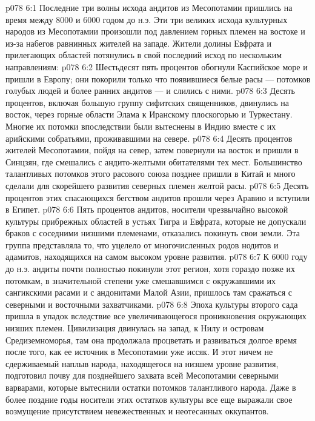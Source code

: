 \vs p078 6:1 Последние три волны исхода андитов из Месопотамии пришлись на время между 8000 и 6000 годом до н.э. Эти три великих исхода культурных народов из Месопотамии произошли под давлением горных племен на востоке и из\hyp{}за набегов равнинных жителей на западе. Жители долины Евфрата и прилегающих областей потянулись в свой последний исход по нескольким направлениям:
\vs p078 6:2 Шестьдесят пять процентов обогнули Каспийское море и пришли в Европу; они покорили только что появившиеся белые расы --- потомков голубых людей и более ранних андитов --- и слились с ними.
\vs p078 6:3 Десять процентов, включая большую группу сифитских священников, двинулись на восток, через горные области Элама к Иранскому плоскогорью и Туркестану. Многие их потомки впоследствии были вытеснены в Индию вместе с их арийскими собратьями, проживавшими на севере.
\vs p078 6:4 Десять процентов жителей Месопотамии, пойдя на север, затем повернули на восток и пришли в Синцзян, где смешались с андито\hyp{}желтыми обитателями тех мест. Большинство талантливых потомков этого расового союза позднее пришли в Китай и много сделали для скорейшего развития северных племен желтой расы.
\vs p078 6:5 Десять процентов этих спасающихся бегством андитов прошли через Аравию и вступили в Египет.
\vs p078 6:6 \pc Пять процентов андитов, носители чрезвычайно высокой культуры прибрежных областей в устьях Тигра и Евфрата, которые не допускали браков с соседними низшими племенами, отказались покинуть свои земли. Эта группа представляла то, что уцелело от многочисленных родов нодитов и адамитов, находящихся на самом высоком уровне развития.
\vs p078 6:7 \pc К 6000 году до н.э. андиты почти полностью покинули этот регион, хотя гораздо позже их потомкам, в значительной степени уже смешавшимся с окружавшими их сангикскими расами и с андонитами Малой Азии, пришлось там сражаться с северными и восточными захватчиками.
\vs p078 6:8 Эпоха культуры второго сада пришла в упадок вследствие все увеличивающегося проникновения окружающих низших племен. Цивилизация двинулась на запад, к Нилу и островам Средиземноморья, там она продолжала процветать и развиваться долгое время после того, как ее источник в Месопотамии уже иссяк. И этот ничем не сдерживаемый наплыв народа, находящегося на низшем уровне развития, подготовил почву для позднейшего захвата всей Месопотамии северными варварами, которые вытеснили остатки потомков талантливого народа. Даже в более поздние годы носители этих остатков культуры все еще выражали свое возмущение присутствием невежественных и неотесанных оккупантов.
